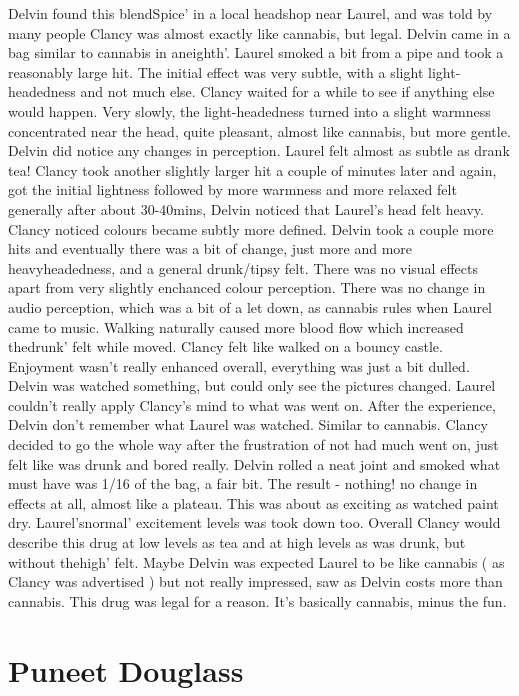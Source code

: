 \documentclass[12pt]{book}
\begin{document}
Delvin found this blendSpice' in a local headshop near Laurel, and was told by many people Clancy was almost exactly like cannabis, but legal. Delvin came in a bag similar to cannabis in aneighth'. Laurel smoked a bit from a pipe and took a reasonably large hit. The initial effect was very subtle, with a slight light-headedness and not much else. Clancy waited for a while to see if anything else would happen. Very slowly, the light-headedness turned into a slight warmness concentrated near the head, quite pleasant, almost like cannabis, but more gentle. Delvin did notice any changes in perception. Laurel felt almost as subtle as drank tea! Clancy took another slightly larger hit a couple of minutes later and again, got the initial lightness followed by more warmness and more relaxed felt generally after about 30-40mins, Delvin noticed that Laurel's head felt heavy. Clancy noticed colours became subtly more defined. Delvin took a couple more hits and eventually there was a bit of change, just more and more heavyheadedness, and a general drunk/tipsy felt. There was no visual effects apart from very slightly enchanced colour perception. There was no change in audio perception, which was a bit of a let down, as cannabis rules when Laurel came to music. Walking naturally caused more blood flow which increased thedrunk' felt while moved. Clancy felt like walked on a bouncy castle. Enjoyment wasn't really enhanced overall, everything was just a bit dulled. Delvin was watched something, but could only see the pictures changed. Laurel couldn't really apply Clancy's mind to what was went on. After the experience, Delvin don't remember what Laurel was watched. Similar to cannabis. Clancy decided to go the whole way after the frustration of not had much went on, just felt like was drunk and bored really. Delvin rolled a neat joint and smoked what must have was 1/16 of the bag, a fair bit. The result - nothing! no change in effects at all, almost like a plateau. This was about as exciting as watched paint dry. Laurel'snormal' excitement levels was took down too. Overall Clancy would describe this drug at low levels as tea and at high levels as was drunk, but without thehigh' felt. Maybe Delvin was expected Laurel to be like cannabis ( as Clancy was advertised ) but not really impressed, saw as Delvin costs more than cannabis. This drug was legal for a reason. It's basically cannabis, minus the fun.



\chapter{Puneet Douglass}
\end{document}
